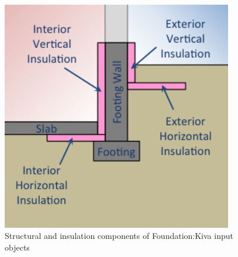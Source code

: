 \begin{figure}[hbtp]
\centering
\includegraphics[width=0.9\textwidth, height=0.9\textheight, keepaspectratio=true]{media/kiva-2d-elements.png}
\caption{Structural and insulation components of Foundation:Kiva input objects}
\end{figure}

